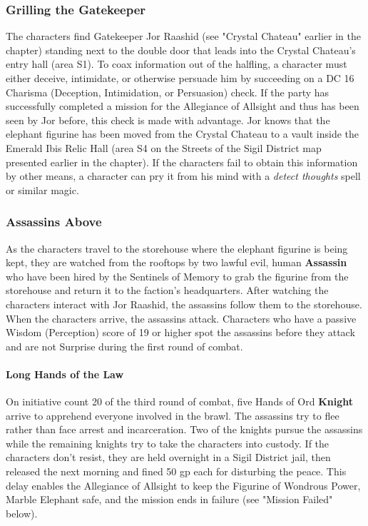 \documentclass[10pt,a4,twoside,twocolumn,openany,nodeprecatedcode]{dndbook}
\begin{document}
\subsubsection{Grilling the Gatekeeper}
The characters find Gatekeeper Jor Raashid (see "Crystal Chateau" earlier in the chapter) standing next to the double door that leads into the Crystal Chateau's entry hall (area S1). To coax information out of the halfling, a character must either deceive, intimidate, or otherwise persuade him by succeeding on a DC 16 Charisma (Deception, Intimidation, or Persuasion) check. If the party has successfully completed a mission for the Allegiance of Allsight and thus has been seen by Jor before, this check is made with advantage.
Jor knows that the elephant figurine has been moved from the Crystal Chateau to a vault inside the Emerald Ibis Relic Hall (area S4 on the Streets of the Sigil District map presented earlier in the chapter). If the characters fail to obtain this information by other means, a character can pry it from his mind with a \textit{detect thoughts} spell or similar magic.
\subsubsection{Assassins Above}
As the characters travel to the storehouse where the elephant figurine is being kept, they are watched from the rooftops by two lawful evil, human \textbf{Assassin} who have been hired by the Sentinels of Memory to grab the figurine from the storehouse and return it to the faction's headquarters. After watching the characters interact with Jor Raashid, the assassins follow them to the storehouse. When the characters arrive, the assassins attack. Characters who have a passive Wisdom (Perception) score of 19 or higher spot the assassins before they attack and are not Surprise during the first round of combat.
\paragraph{Long Hands of the Law}
On initiative count 20 of the third round of combat, five Hands of Ord \textbf{Knight} arrive to apprehend everyone involved in the brawl. The assassins try to flee rather than face arrest and incarceration. Two of the knights pursue the assassins while the remaining knights try to take the characters into custody. If the characters don't resist, they are held overnight in a Sigil District jail, then released the next morning and fined 50 gp each for disturbing the peace. This delay enables the Allegiance of Allsight to keep the Figurine of Wondrous Power, Marble Elephant safe, and the mission ends in failure (see "Mission Failed" below).
\end{document}
